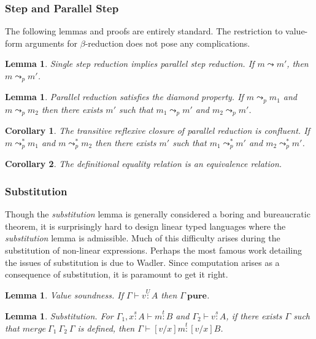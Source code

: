 \documentclass{article}
\newtheorem{corollary}{Corollary}[theorem]
\newtheorem{lemma}[theorem]{Lemma}
\newcommand{\pure}{\textbf{pure}}
\newcommand{\utype}{\overset{U}{:}}
\newcommand{\stype}[1]{\overset{#1}{:}}
\newcommand{\step}{\leadsto}
\newcommand{\pstep}{\leadsto_p}
\begin{document}
  \subsubsection{Step and Parallel Step}

  The following lemmas and proofs are entirely standard. The restriction to value-form arguments for $\beta$-reduction does not pose any complications.

  \begin{lemma}
    Single step reduction implies parallel step reduction. If $m \step m'$, then $m \pstep m'$.
  \end{lemma}

  \begin{lemma}
    Parallel reduction satisfies the diamond property. If $m \pstep m_1$ and $m \pstep m_2$ then there exists $m'$ such that $m_1 \pstep m'$ and $m_2 \pstep m'$.
  \end{lemma}

  \begin{corollary}
    The transitive reflexive closure of parallel reduction is confluent. If $m \pstep^* m_1$ and $m \pstep^* m_2$ then there exists $m'$ such that $m_1 \pstep^* m'$ and $m_2 \pstep^* m'$.
  \end{corollary}

  \begin{corollary}
    The definitional equality relation is an equivalence relation.
  \end{corollary}

  \subsubsection{Substitution}
  Though the \textit{substitution} lemma is generally considered a boring and bureaucratic theorem, it is surprisingly hard to design linear typed languages where the \textit{substitution} lemma is admissible. Much of this difficulty arises during the substitution of non-linear expressions. Perhaps the most famous work detailing the issues of substitution is due to Wadler\cite{substitute}. Since computation arises as a consequence of substitution, it is paramount to get it right.

  \begin{lemma}
    Value soundness. If $\Gamma \vdash v \utype A$ then $\Gamma\ \pure$.
  \end{lemma}

  \begin{lemma}
    Substitution. For $\Gamma_1, x \stype{s} A \vdash m \stype{t} B$ and $\Gamma_2 \vdash v \stype{s} A$, if there exists $\Gamma$ such that $merge\ \Gamma_1\ \Gamma_2\ \Gamma$ is defined, then $\Gamma \vdash [v/x]m \stype{t} [v/x]B$.
  \end{lemma}
\end{document}
